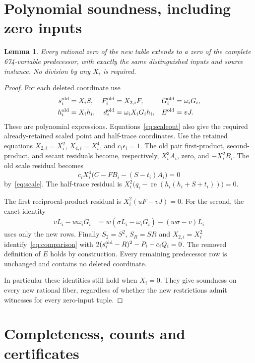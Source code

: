 \documentclass[11pt]{article}
\newtheorem{lemma}[theorem]{Lemma}
\newcommand{\re}{\operatorname{re}}
\begin{document}
\section{Polynomial soundness, including zero inputs}

\begin{lemma}\label{lem:lift}
Every rational zero of the new table extends to a zero of the complete
674-variable predecessor, with exactly the same distinguished inputs
and source instance. No division by any \(X_i\) is required.
\end{lemma}
\begin{proof}
For each deleted coordinate use
\begin{align*}
 s_i^{\rm old}&=X_iS,& F_i^{\rm old}&=X_{2,i}F,&
 G_i^{\rm old}&=\omega_iG_i,\\
 h_i^{\rm old}&=X_ih_i,&
 d_i^{\rm old}&=\omega_iX_iG_ih_i,&
 E^{\rm old}&=vJ.
\end{align*}
These are polynomial expressions. Equations~\eqref{eq:scaleout}
also give the required already-retained scaled point and half-trace
coordinates. Use the retained equations \(X_{2,i}=X_i^2\),
\(X_{4,i}=X_i^4\), and \(c_i\epsilon_i=1\).
The old pair first-product, second-product, and secant residuals become,
respectively, \(X_i^3A_i\), zero, and \(-X_i^2B_i\). The old scale
residual becomes
\[
 c_iX_i^4\bigl(C-FB_i-(S-t_i)A_i\bigr)=0
\]
by~\eqref{eq:scale}. The half-trace residual is
\(X_i^2\bigl(q_i-\re(h_i(h_i+S+t_i))\bigr)=0\).

The first reciprocal-product residual is \(X_i^2(uF-vJ)=0\).
For the second, the exact identity
\begin{align*}
 v\overline{L_i}-w\omega_iG_i
  &=w(\sigma\overline{L_i}-\omega_iG_i)
        -(w\sigma-v)\overline{L_i}
\end{align*}
uses only the new rows. Finally \(S_2=S^2\), \(S_R=SR\) and
\(X_{2,i}=X_i^2\) identify~\eqref{eq:comparison} with
\(2(s_i^{\rm old}-R)^2-P_i-c_iQ_i=0\). The removed definition of
\(E\) holds by construction. Every remaining predecessor row is
unchanged and contains no deleted coordinate.

In particular these identities still hold when \(X_i=0\). They
give soundness on every new rational fiber, regardless of whether
the new restrictions admit witnesses for every zero-input tuple.
\end{proof}

\section{Completeness, counts and certificates}
\end{document}
